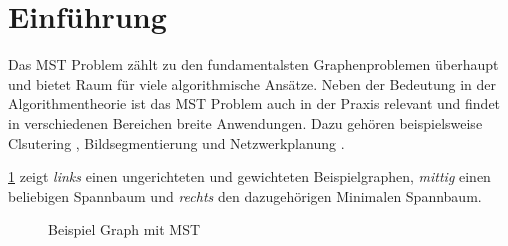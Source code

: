 \section{Einführung}\label{Einführung}
Das MST Problem zählt zu den fundamentalsten Graphenproblemen überhaupt und bietet Raum für viele algorithmische Ansätze.
Neben der Bedeutung in der Algorithmentheorie ist das MST Problem auch in der Praxis relevant und findet in verschiedenen Bereichen breite Anwendungen. Dazu gehören beispielsweise Clsutering \cite{bateni2017affinity}, Bildsegmentierung \cite{wassenberg2009efficient} und Netzwerkplanung \cite{li2011mst}.

\cref{BasicMST-Img} zeigt \textit{links} einen ungerichteten und gewichteten Beispielgraphen, \textit{mittig} einen beliebigen Spannbaum und \textit{rechts} den dazugehörigen Minimalen Spannbaum.

\begin{figure}[H]
    \centering
    
    \caption{Beispiel Graph mit MST}
    \label{BasicMST-Img}
\end{figure}

